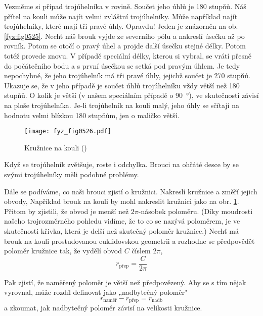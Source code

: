     Vezměme si případ trojúhelníka v rovině. Součet jeho úhlů je \num{180} stupňů. Náš přítel na 
    kouli může najít velmi zvláštní trojúhelníky. Může například najít trojúhelníky, které mají tři 
    pravé úhly. Opravdu! Jeden je znázorněn na ob. \ref{fyz:fig0525}. Nechť náš brouk vyjde ze 
    severního pólu a nakreslí úsečku až po rovník. Potom se otočí o pravý úhel a projde další 
    úsečku stejné délky. Potom totéž provede znovu. V případě speciální délky, kterou si vybral, se 
    vrátí přesně do počátečního bodu a s první úsečkou se setká pod pravým úhlem. Je tedy 
    nepochybné, že jeho trojúhelník má tři pravé úhly, jejichž součet je \num{270} stupňů. Ukazuje 
    se, že v jeho případě je součet úhlů trojúhelníku vždy větší než \num{180} stupňů. O kolik je 
    větší (v našem speciálním případě o \SI{90}{\degree}), ve skutečnosti závisí na ploše 
    trojúhelníka. Je-li trojúhelník na kouli malý, jeho úhly se sčítají na hodnotu velmi blízkou 
    \num{180} stupňům, jen o maličko větší.
    
    \begin{figure}[ht!] %
      \centering
      \texttt{[image: fyz\_fig0526.pdf]}
      \caption{Kružnice na kouli (\cite[s.~779]{Feynman02})}
      \label{fyz:fig0526}
    \end{figure}
     
    Když se trojúhelník zvětšuje, roste i odchylka. Brouci na ohřáté desce by se svými trojúhelníky 
    měli podobné problémy.
    
    Dále se podíváme, co naši brouci zjistí o kružnici. Nakreslí kružnice a změří jejich obvody, 
    Například brouk na kouli by mohl nakreslit kružnici jako na obr. \ref{fyz:fig0526}. Přitom by 
    zjistili, že obvod je menší než \(2\pi\)-násobek poloměru. (Díky moudrosti našeho 
    trojrozměrného pohledu vidíme, že to co se nazývá poloměrem, je ve skutečnosti křivka, která je 
    delší než skutečný poloměr kružnice.) Nechť má brouk na kouli prostudovanou euklidovskou 
    geometrii a rozhodne se předpovědět poloměr kružnice tak, že vydělí obvod \(C\) číslem \(2\pi\),
    \begin{equation}\label{fyz:eq528}
      r_{\text{přep}} = \dfrac{C}{2\pi}
    \end{equation}
    
    Pak zjistí, že naměřený poloměr je větší než předpovězený. Aby se s tím nějak vyrovnal, může 
    rozdíl definovat jako „nadbytečný poloměr"
    \begin{equation}\label{fyz:eq529}
      r_{\text{naměř}} - r_{\text{přep}} = r_{\text{nadb}}
    \end{equation}
    a zkoumat, jak nadbytečný poloměr závisí na velikosti kružnice. 
    
